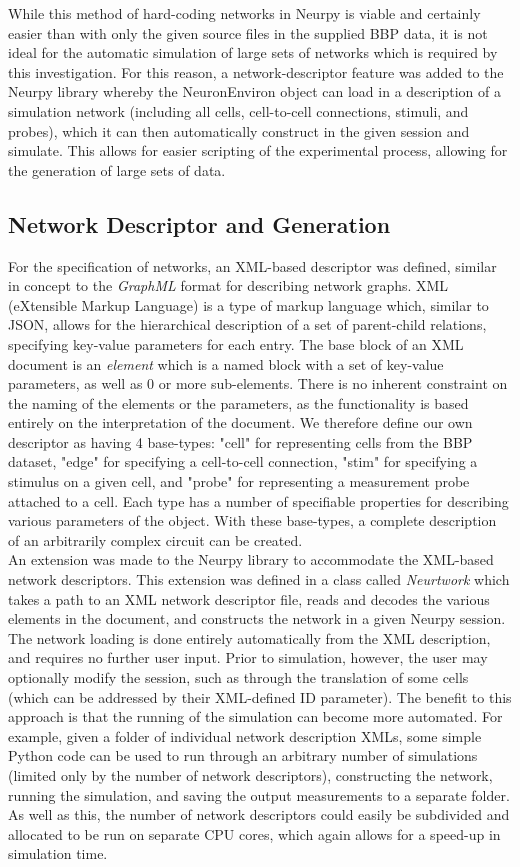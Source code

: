 \documentclass[letterpaper, 10 pt, conference]{ieeeconf}  %
\begin{document}
While this method of hard-coding networks in Neurpy is viable and certainly easier than with only the given source files in the supplied BBP data, it is not ideal for the automatic simulation of large sets of networks which is required by this investigation. For this reason, a network-descriptor feature was added to the Neurpy library whereby the NeuronEnviron object can load in a description of a simulation network (including all cells, cell-to-cell connections, stimuli, and probes), which it can then automatically construct in the given session and simulate. This allows for easier scripting of the experimental process, allowing for the generation of large sets of data.

\subsection*{Network Descriptor and Generation}
For the specification of networks, an XML-based descriptor was defined, similar in concept to the \emph{GraphML} format for describing network graphs. XML (eXtensible Markup Language) is a type of markup language which, similar to JSON, allows for the hierarchical description of a set of parent-child relations, specifying key-value parameters for each entry. The base block of an XML document is an \emph{element} which is a named block with a set of key-value parameters, as well as 0 or more sub-elements. There is no inherent constraint on the naming of the elements or the parameters, as the functionality is based entirely on the interpretation of the document. We therefore define our own descriptor as having 4 base-types: "cell" for representing cells from the BBP dataset, "edge" for specifying a cell-to-cell connection, "stim" for specifying a stimulus on a given cell, and "probe" for representing a measurement probe attached to a cell. Each type has a number of specifiable properties for describing various parameters of the object. With these base-types, a complete description of an arbitrarily complex circuit can be created.\\
An extension was made to the Neurpy library to accommodate the XML-based network descriptors. This extension was defined in a class called \emph{Neurtwork} which takes a path to an XML network descriptor file, reads and decodes the various elements in the document, and constructs the network in a given Neurpy session. The network loading is done entirely automatically from the XML description, and requires no further user input. Prior to simulation, however, the user may optionally modify the session, such as through the translation of some cells (which can be addressed by their XML-defined ID parameter). The benefit to this approach is that the running of the simulation can become more automated. For example, given a folder of individual network description XMLs, some simple Python code can be used to run through an arbitrary number of simulations (limited only by the number of network descriptors), constructing the network, running the simulation, and saving the output measurements to a separate folder. As well as this, the number of network descriptors could easily be subdivided and allocated to be run on separate CPU cores, which again allows for a speed-up in simulation time.\\
\end{document}
